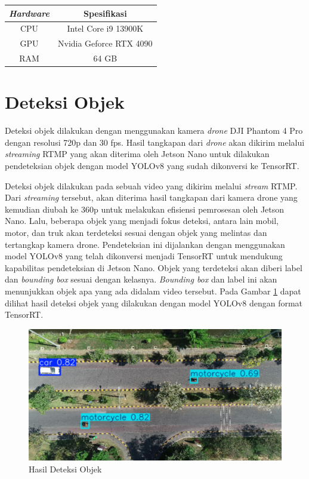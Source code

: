   \begin{table}[h!]
    \centering
    \label{tbl:specpc}
    \begin{tabular}{|c|c|}
      \hline
      \rowcolor[gray]{0.9}
      \textbf{\emph{Hardware}} & \textbf{Spesifikasi} \\ \hline
      CPU               & Intel Core i9 13900K \\ \hline
      GPU               & Nvidia Geforce RTX 4090 \\ \hline
      RAM               & 64 GB \\ \hline
    \end{tabular}
  \end{table}
 
\section{Deteksi Objek}
Deteksi objek dilakukan dengan menggunakan kamera \emph{drone} DJI Phantom 4 Pro dengan resolusi 720p dan 30 fps. Hasil tangkapan dari \emph{drone} akan dikirim melalui \emph{streaming} RTMP yang akan diterima oleh Jetson Nano untuk dilakukan pendeteksian objek dengan model YOLOv8 yang sudah dikonversi ke TensorRT.

Deteksi objek dilakukan pada sebuah video yang dikirim melalui \emph{stream} RTMP. Dari \emph{streaming} tersebut, akan diterima hasil tangkapan dari kamera drone yang kemudian diubah ke 360p untuk melakukan efisiensi pemrosesan oleh Jetson Nano. Lalu, beberapa objek yang menjadi fokus deteksi, antara lain mobil, motor, dan truk akan terdeteksi sesuai dengan objek yang melintas dan tertangkap kamera drone. Pendeteksian ini dijalankan dengan menggunakan model YOLOv8 yang telah dikonversi menjadi TensorRT untuk mendukung kapabilitas pendeteksian di Jetson Nano. Objek yang terdeteksi akan diberi label dan \emph{bounding box} sesuai dengan kelasnya. \emph{Bounding box} dan label ini akan menunjukkan objek apa yang ada didalam video tersebut. Pada Gambar \ref{fig:deteksi objek} dapat dilihat hasil deteksi objek yang dilakukan dengan model YOLOv8 dengan format TensorRT.

\begin{figure} [H] \centering
  \includegraphics[scale=0.3]{bab3/deteksiobjek.png}
  \caption{Hasil Deteksi Objek}
  \label{fig:deteksi objek}
\end{figure}

